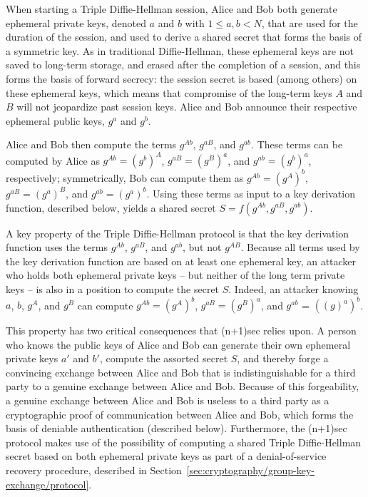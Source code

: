 \documentclass{article}
\begin{document}
When starting a Triple Diffie-Hellman session, Alice and Bob both generate ephemeral private keys, denoted $a$ and $b$ with $1 \leq a, b < N$, that are used for the duration of the session, and used to derive a shared secret that forms the basis of a symmetric key.
As in traditional Diffie-Hellman, these ephemeral keys are not saved to long-term storage, and erased after the completion of a session, and this forms the basis of forward secrecy: the session secret is based (among others) on these ephemeral keys, which means that compromise of the long-term keys $A$ and $B$ will not jeopardize past session keys.
Alice and Bob announce their respective ephemeral public keys, $g^a$ and $g^b$.

Alice and Bob then compute the terms $g^{Ab}$, $g^{aB}$, and $g^{ab}$.
These terms can be computed by Alice as $g^{Ab} = (g^b)^A$, $g^{aB} = (g^B)^a$, and $g^{ab} = (g^b)^a$, respectively; symmetrically, Bob can compute them as $g^{Ab} = (g^A)^b$, $g^{aB} = (g^a)^B$, and $g^{ab} = (g^a)^b$.
Using these terms as input to a key derivation function, described below, yields a shared secret $S = f(g^{Ab}, g^{aB}, g^{ab})$.

A key property of the Triple Diffie-Hellman protocol is that the key derivation function uses the terms $g^{Ab}$, $g^{aB}$, and $g^{ab}$, but not $g^{AB}$.
Because all terms used by the key derivation function are based on at least one ephemeral key, an attacker who holds both ephemeral private keys -- but neither of the long term private keys -- is also in a position to compute the secret $S$.
Indeed, an attacker knowing $a$, $b$, $g^A$, and $g^B$ can compute $g^{Ab} = (g^A)^b$, $g^{aB} = (g^B)^a$, and $g^{ab}$ = $((g)^a)^b$.

This property has two critical consequences that (n+1)sec relies upon.
A person who knows the public keys of Alice and Bob can generate their own ephemeral private keys $a'$ and $b'$, compute the assorted secret $S$, and thereby forge a convincing exchange between Alice and Bob that is indistinguishable for a third party to a genuine exchange between Alice and Bob.
Because of this forgeability, a genuine exchange between Alice and Bob is useless to a third party as a cryptographic proof of communication between Alice and Bob, which forms the basis of deniable authentication (described below).
Furthermore, the (n+1)sec protocol makes use of the possibility of computing a shared Triple Diffie-Hellman secret based on both ephemeral private keys as part of a denial-of-service recovery procedure, described in Section~\ref{sec:cryptography/group-key-exchange/protocol}.
\end{document}
